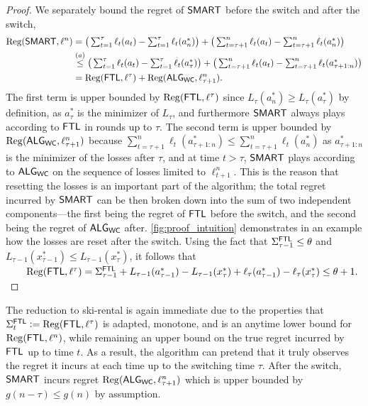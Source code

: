 \begin{proof}
We separately bound the regret of $\mathsf{SMART}$ before the switch and after the switch,
\begin{align*}
\mathrm{Reg}(\mathsf{SMART}, \ell^n)
&=  \big(\textstyle\sum_{t=1}^\tau \ell_t(a_t) - \textstyle\sum_{t=1}^\tau \ell_t(a^*_n)\big) + \big(\textstyle\sum_{t=\tau+1}^n \ell_t(a_t) - \textstyle\sum_{t=\tau+1}^n \ell_t(a^*_n)\big) \\
&\stackrel{(a)}{\le} \big(\textstyle\sum_{t=1}^\tau \ell_t(a_t) - \textstyle\sum_{t=1}^\tau \ell_t(a^*_{\tau})\big) + \big(\textstyle\sum_{t=\tau+1}^n \ell_t(a_t) - \textstyle\sum_{t=\tau+1}^n \ell_t(a^*_{\tau+1:n})\big) \\
&= \mathrm{Reg}(\mathsf{FTL}, \ell^{\tau}) + \mathrm{Reg}(\mathsf{ALG}_{\mathsf{WC}}, \ell_{\tau+1}^n).
\end{align*}
The first term is upper bounded by $\mathrm{Reg}(\mathsf{FTL}, \ell^{\tau})$ since $L_{\tau}(a^*_n) \ge L_{\tau}(a^*_{\tau})$ by definition, as $a^*_{\tau}$ is the minimizer of $L_{\tau}$, and furthermore $\mathsf{SMART}$ always plays according to $\mathsf{FTL}$ in rounds up to $\tau$. The second term is upper bounded by $\mathrm{Reg}(\mathsf{ALG}_{\mathsf{WC}}, \ell_{\tau+1}^n)$ because $\sum_{t=\tau+1}^n \ell_t(a^*_{\tau+1:n}) \leq \sum_{t=\tau+1}^n \ell_t(a^*_n)$ as $a^*_{\tau+1:n}$ is the minimizer of the losses after $\tau$, and at time $t > \tau$, $\mathsf{SMART}$ plays according to $\mathsf{ALG}_{\mathsf{WC}}$ on the sequence of losses limited to $\ell_{t+1}^n$. This is the reason that resetting the losses is an important part of the algorithm; the total regret incurred by $\mathsf{SMART}$ can be then broken down into the sum of two independent components---the first being the regret of $\mathsf{FTL}$ before the switch, and the second being the regret of $\mathsf{ALG}_{\mathsf{WC}}$ after. \cref{fig:proof_intuition} demonstrates in an example how the losses are reset after the switch.
Using the fact that $\Sigma^{\mathsf{FTL}}_{\tau-1} \le \theta$ and $L_{\tau-1}(x^*_{\tau-1}) \le L_{\tau-1}(x^*_{\tau})$, it follows that \\
$~~~~~~\mathrm{Reg}(\mathsf{FTL}, \ell^{\tau}) = \Sigma^{\mathsf{FTL}}_{\tau-1} + L_{\tau-1}(a^*_{\tau-1}) - L_{\tau-1}(x^*_{\tau}) + \ell_{\tau}(a^*_{\tau-1}) - \ell_{\tau}(x^*_{\tau}) \leq \theta + 1.$
\end{proof}

The reduction to ski-rental is again immediate due to the properties that $\Sigma^{\mathsf{FTL}}_t := \mathrm{Reg}(\mathsf{FTL},\ell^{\tau})$ is adapted, monotone, and is an anytime lower bound for $\mathrm{Reg}(\mathsf{FTL},\ell^n)$, while remaining an upper bound on the true regret incurred by $\mathsf{FTL}$ up to time $t$. As a result, the algorithm can pretend that it truly observes the regret it incurs at each time up to the switching time $\tau$. After the switch, $\mathsf{SMART}$ incurs regret $\mathrm{Reg}(\mathsf{ALG}_{\mathsf{WC}}, \ell_{\tau+1}^n)$ which is upper bounded by $g(n-\tau) \leq g(n)$ by assumption.\\

